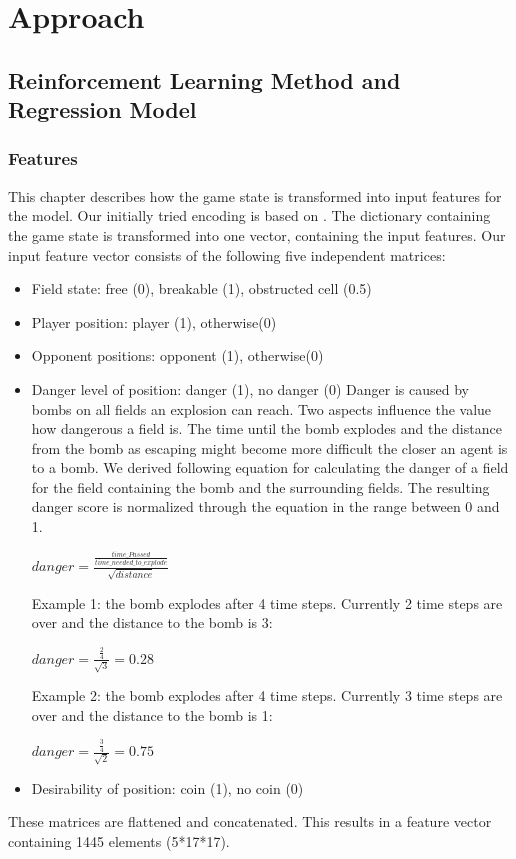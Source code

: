 \section{Approach} 
\label{approach}

\subsection{Reinforcement Learning Method and Regression Model} 
\label{ch:approachA}


\subsubsection{Features}
\label{ch:approachAa}

This chapter describes how the game state is transformed into input features for the model. 
Our initially tried encoding is based on \cite{Kormelink2018}. The dictionary containing the game state is transformed into one vector, containing the input features.
Our input feature vector consists of the following five independent matrices:
\begin{itemize}
	\item Field state: free (0), breakable (1), obstructed cell (0.5)
	\item Player position: player (1), otherwise(0)
	\item Opponent positions: opponent (1), otherwise(0)
	\item Danger level of position: danger (1), no danger (0) \newline
	Danger is caused by bombs on all fields an explosion can reach. Two aspects influence the value how dangerous a field is. The time until the bomb explodes and the distance from the bomb as escaping might become more difficult the closer an agent is to a bomb. We derived following equation for calculating the danger of a field for the field containing the bomb and the surrounding fields. The resulting danger score is normalized through the equation in the range between 0 and 1.
	
	$ danger = \frac{\frac{time\_Passed}{time\_needed\_to\_explode}}{\sqrt{distance}} $
	
	Example 1: the bomb explodes after 4 time steps. Currently 2 time steps are over and the distance to the bomb is 3:
	
	$ danger = \frac{\frac{2}{4}}{\sqrt{3}} = 0.28 $
	
	Example 2: the bomb explodes after 4 time steps. Currently 3 time steps are over and the distance to the bomb is 1:
	
	$ danger = \frac{\frac{3}{4}}{\sqrt{2}} = 0.75 $
	
	\item Desirability of position: coin (1), no coin (0)
\end{itemize}
These matrices are flattened and concatenated. This results in a feature vector containing 1445 elements (5*17*17).

